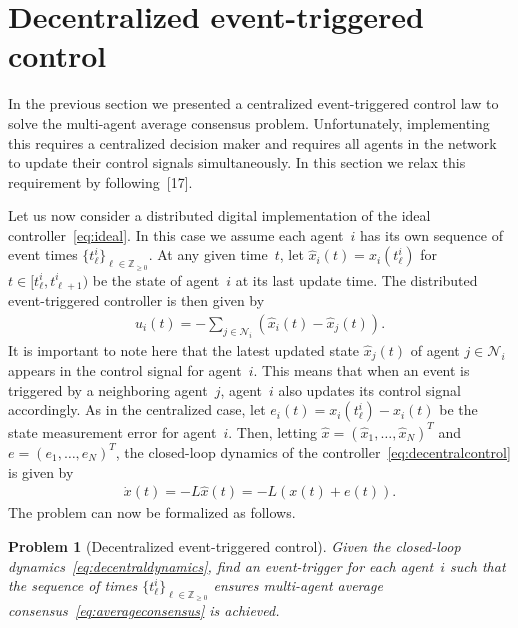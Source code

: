 \documentclass[]{book}
\newtheorem{problem}[theorem]{Problem}
\newcommand{\integernonnegative}{\mathbb{Z}_{\ge 0}}
\newcommand{\NN}{{\mathcal{N}}}
\begin{document}
\section{Decentralized event-triggered control}

In the previous section we presented a centralized event-triggered
control law to solve the multi-agent average consensus
problem. Unfortunately, implementing this requires a centralized
decision maker and requires all agents in the network to update their
control signals simultaneously. In this section we relax this
requirement by following~[17].

Let us now consider a distributed digital implementation of the ideal
controller~\eqref{eq:ideal}. In this case we assume each agent~$i$ has
its own sequence of event times $\{ t_\ell^i \}_{\ell \in
  \integernonnegative}$.  At any given time~$t$, let $\hat{x}_i(t) =
x_i(t_\ell^i)$ for $t \in [t_\ell^i, t_{\ell+1}^i )$ be the state of
agent~$i$ at its last update time. The distributed event-triggered
controller is then given by
\begin{align}\label{eq:decentralcontrol}
  u_i(t) = - \sum_{j \in \NN_i} (\hat{x}_i(t) - \hat{x}_j(t) ) .
\end{align}
It is important to note here that the latest updated state
$\hat{x}_j(t)$ of agent $j \in \NN_i$ appears in the control signal
for agent~$i$. This means that when an event is triggered by a
neighboring agent~$j$, agent~$i$ also updates its control signal
accordingly.  As in the centralized case, let $e_i(t) = x_i(t_\ell^i)
- x_i(t)$ be the state measurement error for agent~$i$. Then, letting
$\hat{x} = (\hat{x}_1, \dots, \hat{x}_N)^T$ and $e = (e_1, \dots,
e_N)^T$, the closed-loop dynamics of the
controller~\eqref{eq:decentralcontrol} is given by
\begin{align}\label{eq:decentraldynamics} 
  \dot{x}(t) = - L \hat{x}(t) = - L ( x(t) + e(t) ).
\end{align}
The problem can now be formalized as follows.

\begin{problem}[Decentralized event-triggered control]
  Given the closed-loop dynamics~\eqref{eq:decentraldynamics}, find an
  event-trigger for each agent~$i$ such that the sequence of times $\{
  t_\ell^i \}_{\ell \in \integernonnegative}$ ensures multi-agent
  average consensus~\eqref{eq:averageconsensus} is achieved.
\end{problem}
\end{document}
